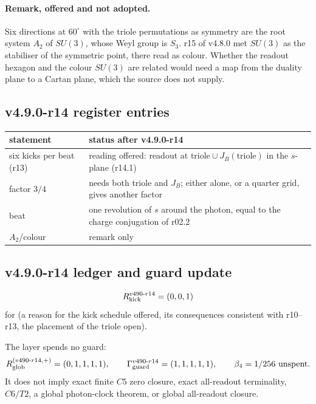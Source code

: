 \paragraph{Remark, offered and not adopted.}
Six directions at \(60^\circ\) with the triole permutations as symmetry are the root system \(A_2\) of \(SU(3)\), whose Weyl
group is \(S_3\).  r15 of v4.8.0 met \(SU(3)\) as the stabiliser of the symmetric point, there read as colour.  Whether the
readout hexagon and the colour \(SU(3)\) are related would need a map from the duality plane to a Cartan plane, which the
source does not supply.

\subsection*{v4.9.0-r14 register entries}
\label{subsec:v490-r14-register}

\begin{center}
\small
\begin{tabular}{@{}>{\raggedright\arraybackslash}p{}>{\raggedright\arraybackslash}p{}@{}}
\toprule
statement & status after v4.9.0-r14\\
\midrule
six kicks per beat (r13) & reading offered: readout at \(\text{triole}\cup J_B(\text{triole})\) in the \(s\)-plane (r14.1)\\
factor \(3/4\) & needs both triole and \(J_B\); either alone, or a quarter grid, gives another factor\\
beat & one revolution of \(s\) around the photon, equal to the charge conjugation of r02.2\\
\(A_2\)/colour & remark only\\
\bottomrule
\end{tabular}
\end{center}

\subsection*{v4.9.0-r14 ledger and guard update}
\label{subsec:v490-r14-ledger-guard}

\[
R_{\rm kick}^{v490\text{-}r14}=(0,0,1)
\]
for (a reason for the kick schedule offered, its consequences consistent with r10--r13, the placement of the triole open).

The layer spends no guard:
\[
R_{\rm glob}^{(v490\text{-}r14,+)}=(0,1,1,1,1),
\qquad
\Gamma_{\rm guard}^{v490\text{-}r14}=(1,1,1,1,1),
\qquad
\beta_4=1/256\ \text{unspent}.
\]
It does not imply exact finite \(C5\) zero closure, exact all-readout terminality,
\(C6/T2\), a global photon-clock theorem, or global all-readout closure.

